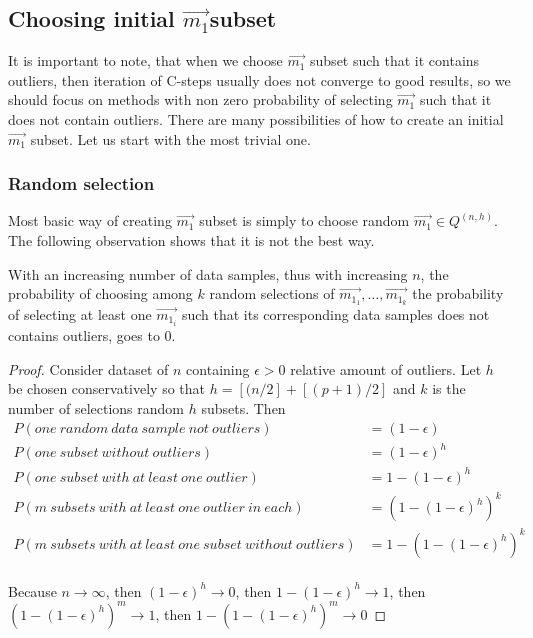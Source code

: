 
\subsection{Choosing initial $\vec{m_1}$subset}

It is important to note, that when we choose $\vec{m_1}$ subset such that it contains outliers, then iteration of  C-steps usually does not converge to good results, so we should focus on methods with non zero probability of selecting $\vec{m_1}$ such that it does not contain outliers.
There are many possibilities of how to create an initial $\vec{m_1}$ subset. Let us start with the most trivial one.


\subsubsection*{Random selection} \label{section:random:h:samples}
Most basic way of creating $\vec{m_1}$ subset is simply to choose random $\vec{m_1} \in Q^{(n, h)}$. The following observation shows that it is not the best way.

\begin{observation} \label{hrandomsamples}
    With an increasing number of data samples, thus with increasing $n$, the probability of choosing among $k$ random selections of $\vec{m_{1_1}}, \ldots ,\vec{m_{1_k}}$ the probability of selecting at least one $\vec{m_{1_i}}$ such that its corresponding data samples does not contains outliers, goes to $0$.
\end{observation}

\begin{proof}
    Consider dataset of $n$ containing $\epsilon > 0$ relative amount of outliers. Let $h$ be chosen conservatively so that $h = [(n/2] + [(p+1)/2]$ and $k$ is the number of selections random $h$ subsets. Then
    \begin{align*}
        P(one~random~data~sample~not~outliers) &= (1-\epsilon) \\
        P(one~subset~without~outliers) &= (1-\epsilon)^h \\
        P(one~subset~with~at~least~one~outlier) &= 1-(1-\epsilon)^h \\
        P(m~subsets~with~at~least~one~outlier~in~each) &= (1-(1-\epsilon)^h)^k \\
        P(m~subsets~with~at~least~one~subset~without~outliers) &= 1-(1-(1-\epsilon)^h)^k \\
    \end{align*}

    Because
$n \rightarrow \infty$, then    
$ (1-\epsilon)^h  \rightarrow 0 $, then   
$ 1- (1-\epsilon)^h  \rightarrow 1$, then
$ (1-(1-\epsilon)^h)^m  \rightarrow 1$, then 
$1- (1-(1-\epsilon)^h)^m  \rightarrow 0 $
\end{proof}

